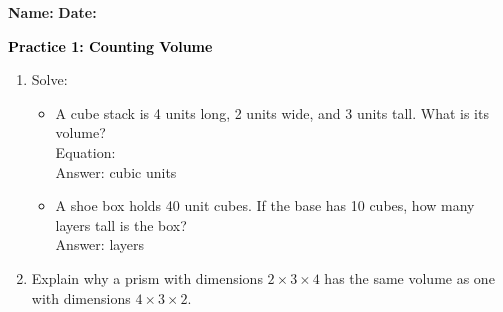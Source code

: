 \documentclass[12pt, letterpaper, fleqn]{article}
\newcommand{\blank}{\underline{\hspace{2.2cm}}}
\newcommand{\blanklong}{\underline{\hspace{6.5cm}}}
\begin{document}
\textbf{Name:} \underline{\hspace{5cm}}
\hfill
\textbf{Date:} \underline{\hspace{3cm}}\\

\begin{tcolorbox}[colback=customteal!20]
    \large\textcolor{black}{\textbf{Practice 1: Counting Volume}}
\end{tcolorbox}

\vspace{5mm}
\begin{enumerate}[itemsep=3cm, leftmargin=0.6cm]
\item Solve:
  \begin{itemize}[itemsep=1.5cm]
    \item A cube stack is 4 units long, 2 units wide, and 3 units tall. What is its volume? \\ Equation: \blanklong \\ Answer: \blank cubic units
    \item A shoe box holds 40 unit cubes. If the base has 10 cubes, how many layers tall is the box? \\ Answer: \blank layers
  \end{itemize}

\item Explain why a prism with dimensions $2 \times 3 \times 4$ has the same volume as one with dimensions $4 \times 3 \times 2$.
\end{enumerate}
\end{document}

